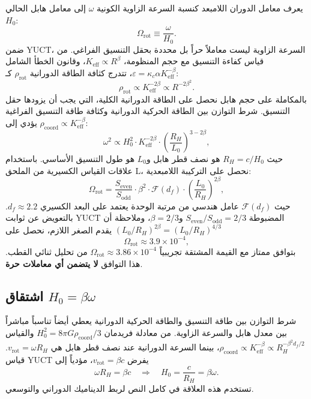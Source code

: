 \documentclass[12pt,a4paper]{article}
\begin{document}
	يعرف معامل الدوران اللامبعد كنسبة السرعة الزاوية الكونية \(\omega\) إلى معامل هابل الحالي \(H_0\):
	\begin{equation}
		\Omega_{\mathrm{rot}} \equiv \frac{\omega}{H_0}.
	\end{equation}
	ضمن YUCT، السرعة الزاوية ليست معاملاً حراً بل محددة بحقل التنسيق الفراغي. من قياس كفاءة التنسيق مع حجم المنظومة، \(K_{\mathrm{eff}} \propto R^{\beta}\)، وقانون الخطأ الشامل \(\varepsilon = \kappa_c \alpha K_{\mathrm{eff}}^{-\beta}\)، تتدرج كثافة الطاقة الدورانية \(\rho_{\mathrm{rot}}\) كـ:
	\begin{equation}
		\rho_{\mathrm{rot}} \propto K_{\mathrm{eff}}^{-2\beta} \propto R^{-2\beta^2}.
	\end{equation}
	بالمكاملة على حجم هابل نحصل على الطاقة الدورانية الكلية، التي يجب أن يزودها حقل التنسيق. شرط التوازن بين الطاقة الحركية الدورانية وكثافة طاقة التنسيق الفراغية \(\rho_{\mathrm{coord}} \propto K_{\mathrm{eff}}^{-\beta}\) يؤدي إلى:
	\begin{equation}
		\omega^2 \propto H_0^2 \cdot K_{\mathrm{eff}}^{-2\beta} \cdot \left(\frac{R_H}{L_0}\right)^{3-2\beta},
	\end{equation}
	حيث \(R_H = c/H_0\) هو نصف قطر هابل و\(L_0\) هو طول التنسيق الأساسي. باستخدام علاقات القياس الكسيرية من الملحق L، نحصل على التركيبة اللامبعدية:
	\begin{equation}
		\Omega_{\mathrm{rot}} = \frac{S_{\mathrm{even}}}{S_{\mathrm{odd}}} \cdot \beta^2 \cdot \mathcal{F}(d_f) \cdot \left(\frac{L_0}{R_H}\right)^{2\beta},
	\end{equation}
	حيث \(\mathcal{F}(d_f)\) عامل هندسي من مرتبة الوحدة يعتمد على البعد الكسيري \(d_f \approx 2.2\). بالتعويض عن ثوابت YUCT المضبوطة \(S_{\mathrm{even}}/S_{\mathrm{odd}} = 2/3\) و\(\beta = 2/3\)، وملاحظة أن \((L_0/R_H)^{2\beta} = (L_0/R_H)^{4/3}\) يقدم الصغر اللازم، نحصل على
	\begin{equation}
		\boxed{\Omega_{\mathrm{rot}} \approx 3.9 \times 10^{-4}},
	\end{equation}
	بتوافق ممتاز مع القيمة المشتقة تجريبياً \(\Omega_{\mathrm{rot}} \approx 3.86 \times 10^{-4}\) من تحليل ثنائي القطب. هذا التوافق \textbf{لا يتضمن أي معاملات حرة}.
	
	\subsection{اشتقاق \(H_0 = \beta \omega\)}
	
	شرط التوازن بين طاقة التنسيق والطاقة الحركية الدورانية يعطي أيضاً تناسباً مباشراً بين معدل هابل والسرعة الزاوية. من معادلة فريدمان \(H_0^2 = 8\pi G \rho_{\mathrm{coord}} / 3\) والقياس \(\rho_{\mathrm{coord}} \propto K_{\mathrm{eff}}^{-\beta} \propto R_H^{-\beta^2 d_f /2}\)، بينما السرعة الدورانية عند نصف قطر هابل هي \(v_{\mathrm{rot}} = \omega R_H\). قياس YUCT يفرض \(v_{\mathrm{rot}} = \beta c\)، مؤدياً إلى
	\begin{equation}
		\omega R_H = \beta c \quad \Rightarrow \quad H_0 = \frac{c}{R_H} = \beta \omega.
		\label{eq:H0-beta-omega}
	\end{equation}
	تستخدم هذه العلاقة في كامل النص لربط الديناميك الدوراني والتوسعي.
	
\end{document}
